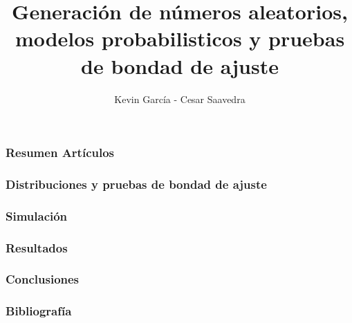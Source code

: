 \documentclass[12pt]{beamer}
\author{Kevin García - Cesar Saavedra}
\title{Generación de números aleatorios, modelos probabilisticos y pruebas de bondad de ajuste}
\begin{document}
\begin{frame}
\titlepage
\end{frame}

\begin{frame}
\frametitle{Resumen Artículos}
\end{frame}

\begin{frame}
\frametitle{Distribuciones y pruebas de bondad de ajuste}
\end{frame}

\begin{frame}
\frametitle{Simulación}
\end{frame}

\begin{frame}
\frametitle{Resultados}
\end{frame}

\begin{frame}
\frametitle{Conclusiones}
\end{frame}

\begin{frame}
\frametitle{Bibliografía}
\end{frame}
\end{document}
